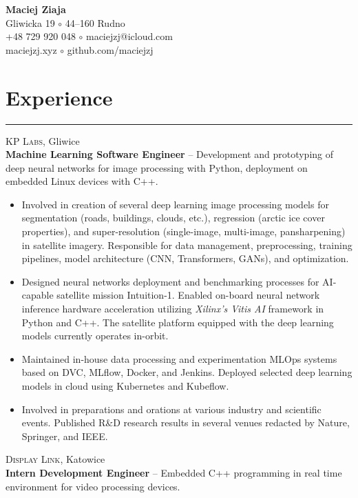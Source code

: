 \documentclass{article}
\begin{document}
\hfill
\begin{minipage}{0.5\textwidth}\raggedleft
	{\Large \textbf{Maciej Ziaja}} \\
	Gliwicka 19 $\circ$ 44--160 Rudno \\
	+48 729 920 048 $\circ$ maciejzj@icloud.com \\
	maciejzj.xyz $\circ$ github.com/maciejzj
\end{minipage}

\section*{Experience}

\hrule \medskip

\textsc{KP Labs}, Gliwice \\
\textbf{Machine Learning Software Engineer} -- Development and prototyping of
deep neural networks for image processing with Python, deployment on embedded
Linux devices with C++.
\begin{itemize}
	\item Involved in creation of several deep learning image processing models
		for segmentation (roads, buildings, clouds, etc.), regression (arctic
		ice cover properties), and super-resolution (single-image, multi-image,
		pansharpening) in satellite imagery. Responsible for data management,
		preprocessing, training pipelines, model architecture (CNN,
		Transformers, GANs), and optimization.
	\item Designed neural networks deployment and benchmarking processes for
		AI-capable satellite mission Intuition-1. Enabled on-board neural
		network inference hardware acceleration utilizing \textit{Xilinx's Vitis
		AI} framework in Python and C++. The satellite platform equipped with
		the deep learning models currently operates in-orbit.
	\item Maintained in-house data processing and experimentation MLOps systems
		based on DVC, MLflow, Docker, and Jenkins. Deployed selected deep
		learning models in cloud using Kubernetes and Kubeflow.
	\item Involved in preparations and orations at various industry and
		scientific events. Published R\&D research results in several venues
		redacted by Nature, Springer, and IEEE.
\end{itemize}
\textsc{Display Link}, Katowice \\
\textbf{Intern Development Engineer} -- Embedded C++ programming in real time
environment for video processing devices.
\end{document}
